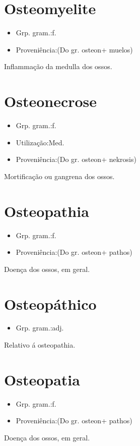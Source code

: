 \section{Osteomyelite}
\begin{itemize}
\item {Grp. gram.:f.}
\end{itemize}
\begin{itemize}
\item {Proveniência:(Do gr. \textunderscore osteon\textunderscore  + \textunderscore muelos\textunderscore )}
\end{itemize}
Inflammação da medulla dos ossos.
\section{Osteonecrose}
\begin{itemize}
\item {Grp. gram.:f.}
\end{itemize}
\begin{itemize}
\item {Utilização:Med.}
\end{itemize}
\begin{itemize}
\item {Proveniência:(Do gr. \textunderscore osteon\textunderscore  + \textunderscore nekrosis\textunderscore )}
\end{itemize}
Mortificação ou gangrena dos ossos.
\section{Osteopathia}
\begin{itemize}
\item {Grp. gram.:f.}
\end{itemize}
\begin{itemize}
\item {Proveniência:(Do gr. \textunderscore osteon\textunderscore  + \textunderscore pathos\textunderscore )}
\end{itemize}
Doença dos ossos, em geral.
\section{Osteopáthico}
\begin{itemize}
\item {Grp. gram.:adj.}
\end{itemize}
Relativo á osteopathia.
\section{Osteopatia}
\begin{itemize}
\item {Grp. gram.:f.}
\end{itemize}
\begin{itemize}
\item {Proveniência:(Do gr. \textunderscore osteon\textunderscore  + \textunderscore pathos\textunderscore )}
\end{itemize}
Doença dos ossos, em geral.
